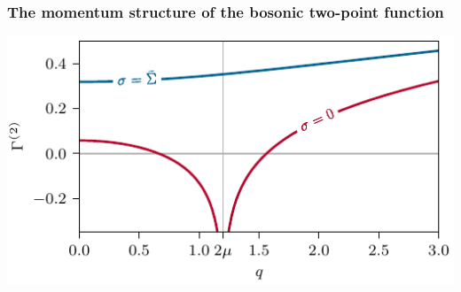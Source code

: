 \subsubsection{The momentum structure of the bosonic two-point function}
\label{subsubsec:momentum_structure}
	{\fullWidthTwoColumnFigureSpacing}
	{%
		\includegraphics[width=\subcaptionFigureWidth-0.1cm]{gn/figures/gamma2_compare_1.pdf} %
		\captionsetup{width=\subcaptionFigureWidth}%
		\caption{%
			The bosonic two-point function $\gtwovar{\shom}{\mu}{T}{q}$ as a function of the external momentum $q$ at constant chemical potential ${\mu/\snull = 0.6}$ and vanishing temperature ${T = 0}$ evaluated at the homogeneous global minimum ${\shom = \sminhom ( \mu, 0 ) \neq 0}$ and the homogeneous local minimum ${\shom = 0}$.
			The unphysical red curve (stemming from an evaluation away from the homogeneous ground state, \viz{} ${\shom = 0}$) has a pole at ${q = 2\mkern2mu \mu}$.
		}%
		\label{fig:gamma2_compare_1}
	}%
